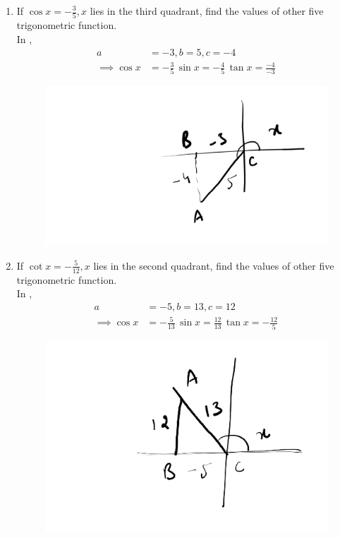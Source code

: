 \begin{enumerate}[label=\thesubsection.\arabic*,ref=\thesubsection.\theenumi,itemsep=1ex]
%
\item If $\cos x = -\frac{3}{5}, x$ lies in the third quadrant, find the values of other five trigonometric function.
%
\\
\solution
	In , 
\begin{align}
	a &= -3, b = 5, c = -4
	\\
\implies \cos x &= -\frac{3}{5}\,
\sin x = -\frac{4}{5}\,
\tan x = \frac{-4}{-3}
\end{align}
\begin{figure}[H]
	\begin{center}
		{\includegraphics[width=0.6\columnwidth]{figs/ncert/id/1.png}}
	\end{center}
	\caption{}
	\label{fig:ncert-id-1}	
\end{figure}
\item If $\cot x = - \frac{5}{12}, x$ lies in the second quadrant, find the values of other five trigonometric function.
%
\\
\solution
	In , 
\begin{align}
	a &= -5, b = 13, c = 12 
	\\
\implies \cos x &= -\frac{5}{13}\,
\sin x = \frac{12}{13}\,
\tan x = -\frac{12}{5}
\end{align}
\begin{figure}[H]
	\begin{center}
		{\includegraphics[width=0.6\columnwidth]{figs/ncert/id/2.png}}

\end{center}
\end{figure}
\end{enumerate}
